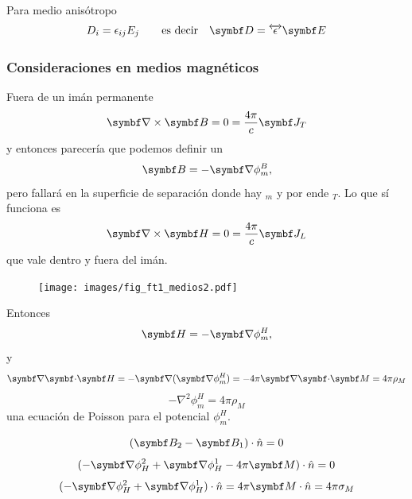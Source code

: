 \documentclass[10pt,oneside]{CBFT_book}
\begin{document}
Para medio anisótropo
\[
	D_i = \epsilon_{ij} E_j \qquad \text{es decir} \quad \vb{D} = \overleftrightarrow{\epsilon} \vb{E}
\]

\subsubsection{Consideraciones en medios magnéticos}

Fuera de un imán permanente 
\[
	\rotorm{B} = 0 = \frac{4\pi}{c}\vb{J}_T
\]
y entonces parecería que podemos definir un
\[
	\vb{B} = -\Nabla \phi_m^B,
\]
pero fallará en la superficie de separación donde hay $_m$ y por ende $_T$. Lo que sí funciona
es
\[
	\rotorm{H} = 0 = \frac{4\pi}{c}\vb{J}_L
\]
que vale dentro y fuera del imán.
\begin{figure}[htb]
	\begin{center}
	\texttt{[image: images/fig\_ft1\_medios2.pdf]}	 
	\end{center}
	\caption{}
\end{figure}

Entonces
\[
	\vb{H} = -\Nabla \phi_m^H,
\]
y
\[
	\divem{H} = -\Nabla(\Nabla \phi^H_m ) = -4\pi \divem{M} = 4\pi\rho_M
\]
\[
	-\nabla^2 \phi_m^H = 4\pi\rho_M
\]
una ecuación de Poisson para el potencial $\phi_m^H$.

\[
	(\vb{B}_2 - \vb{B}_1)\cdot\hat{n} = 0
\]
\[
	(-\Nabla \phi^2_H + \Nabla \phi^1_H - 4\pi \vb{M})\cdot\hat{n} = 0
\]
\[
	(-\Nabla \phi^2_H + \Nabla \phi^1_H )\cdot\hat{n} = 4\pi \vb{M}\cdot\hat{n} = 4\pi \sigma_M
\]
\end{document}
